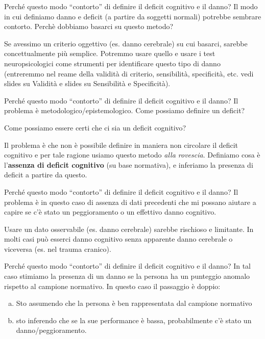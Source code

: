 \documentclass[
  ignorenonframetext,
]{beamer}
\begin{document}
\begin{frame}{Perché questo modo ``contorto'' di definire il deficit
cognitivo e il danno?}
\label{perchuxe9-questo-modo-contorto-di-definire-il-deficit-cognitivo-e-il-danno}
Il modo in cui definiamo danno e deficit (a partire da soggetti normali)
potrebbe sembrare contorto. Perchè dobbiamo basarci su questo metodo?

Se avessimo un criterio oggettivo (es. danno cerebrale) su cui basarci,
sarebbe concettualmente più semplice. Potremmo usare quello e usare i
test neuropsicologici come strumenti per identificare questo tipo di
danno (entreremmo nel reame della validità di criterio, sensibilità,
specificità, etc. vedi slides su Validità e slides su Sensibilità e
Specificità).
\end{frame}

\begin{frame}{Perché questo modo ``contorto'' di definire il deficit
cognitivo e il danno?}
\label{perchuxe9-questo-modo-contorto-di-definire-il-deficit-cognitivo-e-il-danno-1}
Il problema è metodologico/epistemologico. Come possiamo definire un
deficit?

Come possiamo essere certi che ci sia un deficit cognitivo?

Il problema è che non è possibile definire in maniera non circolare il
deficit cognitivo e per tale ragione usiamo questo metodo \emph{alla
rovescia}. Definiamo cosa è l'\textbf{assenza di deficit cognitivo} (su
base normativa), e inferiamo la presenza di deficit a partire da questo.
\end{frame}

\begin{frame}{Perché questo modo ``contorto'' di definire il deficit
cognitivo e il danno?}
\label{perchuxe9-questo-modo-contorto-di-definire-il-deficit-cognitivo-e-il-danno-2}
Il problema è in questo caso di assenza di dati precedenti che mi
possano aiutare a capire se c'è stato un peggioramento o un effettivo
danno cognitivo.

Usare un dato osservabile (es. danno cerebrale) sarebbe rischioso e
limitante. In molti casi può esserci danno cognitivo senza apparente
danno cerebrale o viceversa (es. nel trauma cranico).
\end{frame}

\begin{frame}{Perché questo modo ``contorto'' di definire il deficit
cognitivo e il danno?}
\label{perchuxe9-questo-modo-contorto-di-definire-il-deficit-cognitivo-e-il-danno-3}
In tal caso stimiamo la presenza di un danno se la persona ha un
punteggio anomalo rispetto al campione normativo. In questo caso il
passaggio è doppio:

\begin{enumerate}
[a)]
\item
  Sto assumendo che la persona è ben rappresentata dal campione
  normativo
\item
  sto inferendo che se la sue performance è bassa, probabilmente c'è
  stato un danno/peggioramento.
\end{enumerate}
\end{frame}
\end{document}
